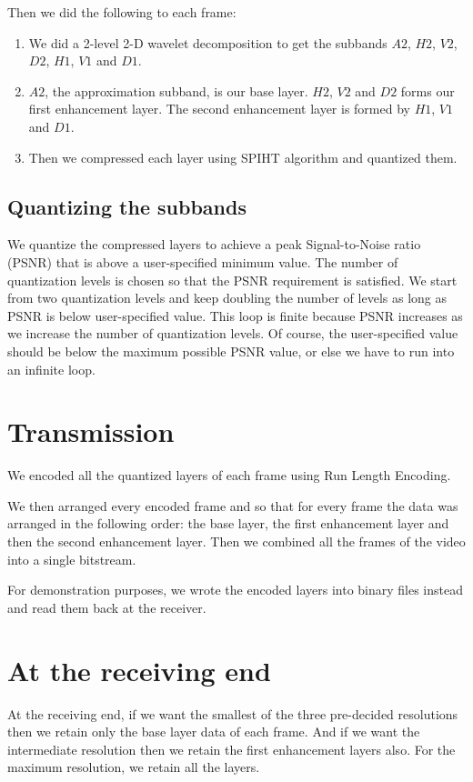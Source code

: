 \documentclass[10pt,twocolumn]{article}
\begin{document}
Then we did the following to each frame:
\begin{enumerate}
    \item We did a 2-level 2-D wavelet decomposition to get the subbands $A2$, $H2$, $V2$, $D2$, $H1$, $V1$ and $D1$.
    \item $A2$, the approximation subband, is our base layer. $H2$, $V2$ and $D2$ forms our first enhancement layer. The second enhancement layer is formed by $H1$, $V1$ and $D1$.
    \item Then we compressed each layer using SPIHT\cite{amirSaid1996} algorithm and quantized them.
\end{enumerate}

\subsection*{Quantizing the subbands}

We quantize the compressed layers to achieve a peak Signal-to-Noise ratio (PSNR) that is above a user-specified minimum value. The number of quantization levels is chosen so that the PSNR requirement is satisfied. We start from two quantization levels and keep doubling the number of levels as long as PSNR is below user-specified value. This loop is finite because PSNR increases as we increase the number of quantization levels. Of course, the user-specified value should be below the maximum possible PSNR value, or else we have to run into an infinite loop.

\section{Transmission}

We encoded all the quantized layers of each frame using Run Length Encoding.

We then arranged every encoded frame and so that for every frame the data was arranged in the following order: the base layer, the first enhancement layer and then the second enhancement layer. Then we combined all the frames of the video into a single bitstream.

For demonstration purposes, we wrote the encoded layers into binary files instead and read them back at the receiver.

\section{At the receiving end}

At the receiving end, if we want the smallest of the three pre-decided resolutions then we retain only the base layer data of each frame. And if we want the intermediate resolution then we retain the first enhancement layers also. For the maximum resolution, we retain all the layers.
\end{document}

